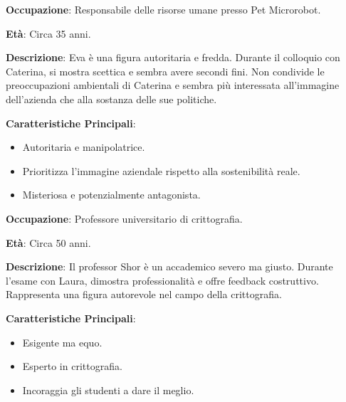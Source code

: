 \vspace{0.5cm}

\begin{tcolorbox}[colback=white,colframe=black,title=\textbf{Eva}]
\begin{multicols}{2}
\textbf{Occupazione}: Responsabile delle risorse umane presso Pet Microrobot.

\textbf{Età}: Circa 35 anni.

\textbf{Descrizione}: Eva è una figura autoritaria e fredda. Durante il colloquio con Caterina, si mostra scettica e sembra avere secondi fini. Non condivide le preoccupazioni ambientali di Caterina e sembra più interessata all'immagine dell'azienda che alla sostanza delle sue politiche.

\textbf{Caratteristiche Principali}:
\begin{itemize}
    \item Autoritaria e manipolatrice.
    \item Prioritizza l'immagine aziendale rispetto alla sostenibilità reale.
    \item Misteriosa e potenzialmente antagonista.
\end{itemize}
\end{multicols}
\end{tcolorbox}

\vspace{0.5cm}

\begin{tcolorbox}[colback=white,colframe=black,title=\textbf{Professor Shor}]
\begin{multicols}{2}
\textbf{Occupazione}: Professore universitario di crittografia.

\textbf{Età}: Circa 50 anni.

\textbf{Descrizione}: Il professor Shor è un accademico severo ma giusto. Durante l'esame con Laura, dimostra professionalità e offre feedback costruttivo. Rappresenta una figura autorevole nel campo della crittografia.

\textbf{Caratteristiche Principali}:
\begin{itemize}
    \item Esigente ma equo.
    \item Esperto in crittografia.
    \item Incoraggia gli studenti a dare il meglio.
\end{itemize}
\end{multicols}
\end{tcolorbox}


